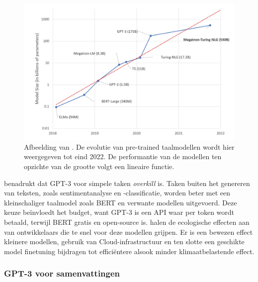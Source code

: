 \begin{figure}[H]
	\includegraphics{img/graph-language-models.png}
	\caption{Afbeelding van \textcite{Simon2021}. De evolutie van pre-trained taalmodellen wordt hier weergegeven tot eind 2022. De performantie van de modellen ten opzichte van de grootte volgt een lineaire functie.}
\end{figure}


\textcite{Li2022} benadrukt dat GPT-3 voor simpele taken \textit{overkill} is. Taken buiten het genereren van teksten, zoals sentimentanalyse en -classificatie, worden beter met een kleinschaliger taalmodel zoals BERT en verwante modellen uitgevoerd. Deze keuze beïnvloedt het budget, want GPT-3 is een API waar per token wordt betaald, terwijl BERT gratis en open-source is. \textcite{Strubell2019, Simon2021} halen de ecologische effecten aan van ontwikkelaars die te snel voor deze modellen grijpen. Er is een bewezen effect kleinere modellen, gebruik van Cloud-infrastructuur en ten slotte een geschikte model finetuning bijdragen tot efficiëntere alsook minder klimaatbelastende effect.


\subsubsection{GPT-3 voor samenvattingen}

